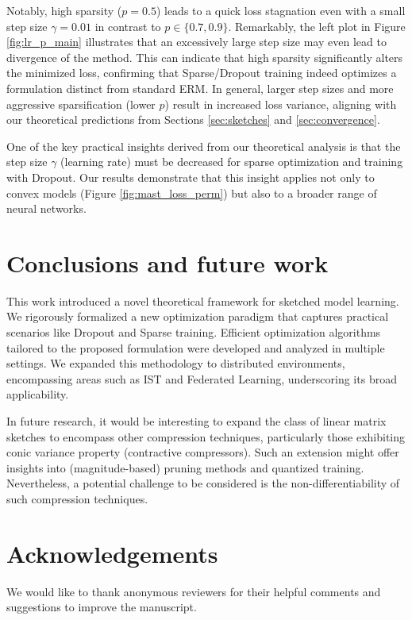 \documentclass{article}
\theoremstyle{plain}
\theoremstyle{plain}
\theoremstyle{definition}
\theoremstyle{remark}
\begin{document}
Notably, high sparsity ($p=0.5$) leads to a quick loss stagnation even with a small step size $\gamma = 0.01$ in contrast to $p \in\{0.7, 0.9\}$.
Remarkably, the left plot in Figure \ref{fig:lr_p_main} illustrates that an excessively large step size may even lead to divergence of the method.
This can indicate that high sparsity significantly alters the minimized loss, confirming that Sparse/Dropout training indeed optimizes a formulation distinct from standard ERM.
%
In general, larger step sizes and more aggressive sparsification (lower $p$) result in increased loss variance, aligning with our theoretical predictions from Sections \ref{sec:sketches} and \ref{sec:convergence}.

One of the key practical insights derived from our theoretical analysis is that the step size $\gamma$ (learning rate) must be decreased for sparse optimization and training with Dropout. Our results demonstrate that this insight applies not only to convex models (Figure \ref{fig:mast_loss_perm}) but also to a broader range of neural networks.

\section{Conclusions and future work} \label{sec:conclusion}

This work introduced a novel theoretical framework for sketched model learning. We rigorously formalized a new optimization paradigm that captures practical scenarios like Dropout and Sparse training.
Efficient optimization algorithms tailored to the proposed formulation were developed and analyzed in multiple settings. We expanded this methodology to distributed environments, encompassing areas such as IST and Federated Learning, underscoring its broad applicability.

In future research, it would be interesting to expand the class of linear matrix sketches to encompass other compression techniques, particularly those exhibiting conic variance property (contractive compressors). Such an extension might offer insights into (magnitude-based) pruning methods and quantized training. Nevertheless, a potential challenge to be considered is the non-differentiability of such compression techniques.

\section*{Acknowledgements}

We would like to thank anonymous reviewers for their helpful comments and suggestions to improve the manuscript.
\end{document}
